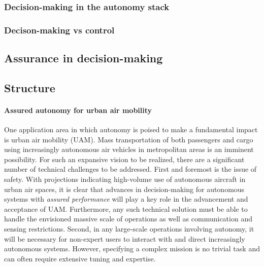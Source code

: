 \subsubsection{Decision-making in the autonomy stack}

\subsubsection{Decison-making vs control}

\subsection{Assurance in decision-making}

\subsection{Structure}


\paragraph{Assured autonomy for urban air mobility} One application area in which autonomy is poised to make a fundamental impact is urban air mobility (UAM). Mass transportation of both passengers and cargo using increasingly autonomous air vehicles in metropolitan areas is an imminent possibility. For such an expansive vision to be realized, there are a significant number of technical challenges to be addressed.  First and foremost is the issue of safety. With projections indicating high-volume use of autonomous aircraft in urban air spaces, it is clear that advances in decision-making for autonomous systems with \emph{assured performance} will play a key role in the advancement and acceptance of UAM. Furthermore, any such technical solution must be able to handle the envisioned massive scale of operations as well as communication and sensing restrictions. Second, in any large-scale operations involving autonomy, it will be necessary for non-expert users to interact with and direct increasingly autonomous systems. However, specifying a complex mission is no trivial task and can often require extensive tuning and expertise.


